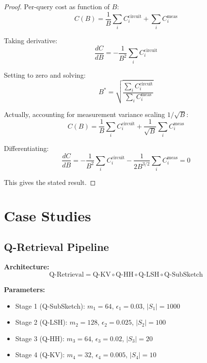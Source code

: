 \documentclass[11pt]{article}
\begin{document}
\begin{proof}
Per-query cost as function of $B$:
\begin{equation}
C(B) = \frac{1}{B}\sum_i C_i^{\text{circuit}} + \sum_i C_i^{\text{meas}}
\end{equation}

Taking derivative:
\begin{equation}
\frac{dC}{dB} = -\frac{1}{B^2}\sum_i C_i^{\text{circuit}}
\end{equation}

Setting to zero and solving:
\begin{equation}
B^* = \sqrt{\frac{\sum_i C_i^{\text{circuit}}}{\sum_i C_i^{\text{meas}}}}
\end{equation}

Actually, accounting for measurement variance scaling $1/\sqrt{B}$:
\begin{equation}
C(B) = \frac{1}{B}\sum_i C_i^{\text{circuit}} + \frac{1}{\sqrt{B}}\sum_i C_i^{\text{meas}}
\end{equation}

Differentiating:
\begin{equation}
\frac{dC}{dB} = -\frac{1}{B^2}\sum_i C_i^{\text{circuit}} - \frac{1}{2B^{3/2}}\sum_i C_i^{\text{meas}} = 0
\end{equation}

This gives the stated result.
\end{proof}

\section{Case Studies}
\label{sec:case_studies}

\subsection{Q-Retrieval Pipeline}

\textbf{Architecture:}
\begin{equation}
\text{Q-Retrieval} = \text{Q-KV} \circ \text{Q-HH} \circ \text{Q-LSH} \circ \text{Q-SubSketch}
\end{equation}

\textbf{Parameters:}
\begin{itemize}
\item Stage 1 (Q-SubSketch): $m_1=64$, $\epsilon_1=0.03$, $|S_1|=1000$
\item Stage 2 (Q-LSH): $m_2=128$, $\epsilon_2=0.025$, $|S_2|=100$
\item Stage 3 (Q-HH): $m_3=64$, $\epsilon_3=0.02$, $|S_3|=20$
\item Stage 4 (Q-KV): $m_4=32$, $\epsilon_4=0.005$, $|S_4|=10$
\end{itemize}
\end{document}
